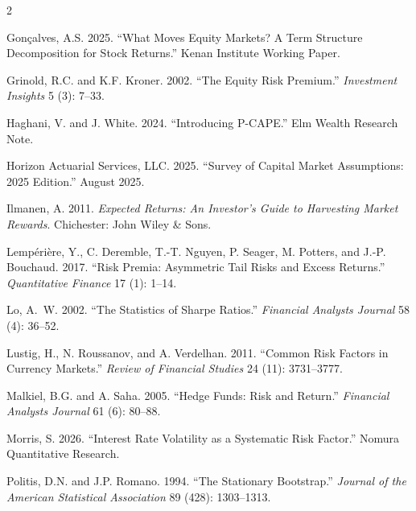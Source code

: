 \documentclass[pdftex,12pt,a4paper]{article}
\begin{document}
\begin{multicols}{2}
\begin{thebibliography}{}
	Gon\c{c}alves, A.S. 2025. ``What Moves Equity Markets? A Term Structure Decomposition for Stock Returns.'' Kenan Institute Working Paper.

	Grinold, R.C. and K.F. Kroner. 2002. ``The Equity Risk Premium.'' \textit{Investment Insights} 5 (3): 7--33.

	Haghani, V. and J. White. 2024. ``Introducing P-CAPE.'' Elm Wealth Research Note.

	Horizon Actuarial Services, LLC. 2025. ``Survey of Capital Market Assumptions: 2025 Edition.'' August 2025.

	Ilmanen, A. 2011. \textit{Expected Returns: An Investor's Guide to Harvesting Market Rewards}. Chichester: John Wiley \& Sons.

	Lemp\'eri\`ere, Y., C. Deremble, T.-T. Nguyen, P. Seager, M. Potters, and J.-P. Bouchaud. 2017. ``Risk Premia: Asymmetric Tail Risks and Excess Returns.'' \textit{Quantitative Finance} 17 (1): 1--14.

	Lo, A.~W. 2002. ``The Statistics of Sharpe Ratios.'' \textit{Financial Analysts Journal} 58 (4): 36--52.

	Lustig, H., N. Roussanov, and A. Verdelhan. 2011. ``Common Risk Factors in Currency Markets.'' \textit{Review of Financial Studies} 24 (11): 3731--3777.

	Malkiel, B.G. and A. Saha. 2005. ``Hedge Funds: Risk and Return.'' \textit{Financial Analysts Journal} 61 (6): 80--88.

	Morris, S. 2026. ``Interest Rate Volatility as a Systematic Risk Factor.'' Nomura Quantitative Research.

	Politis, D.N. and J.P. Romano. 1994. ``The Stationary Bootstrap.'' \textit{Journal of the American Statistical Association} 89 (428): 1303--1313.


\end{thebibliography}
\end{multicols}
\end{document}
